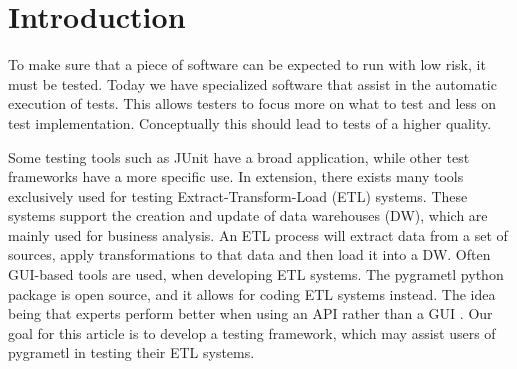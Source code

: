 \section{Introduction} %

To make sure that a piece of software can be expected to run with low risk, it must be tested. Today we have specialized software that assist in the automatic execution of tests. This allows testers to focus more on what to test and less on test implementation. Conceptually this should lead to tests of a higher quality.

Some testing tools such as JUnit have a  broad application, while other test frameworks have a more specific use. In extension, there exists many tools exclusively used for testing  Extract-Transform-Load (ETL) systems. These systems support the creation and update of data warehouses (DW), which are mainly used for business analysis. An ETL process will extract data from a set of sources, apply transformations to that data and then load it into a DW. Often GUI-based tools are used, when developing ETL systems. The pygrametl python package is open source, and it allows for coding ETL systems instead. The idea being that experts perform better when using an API rather than a GUI \cite{thomsen2009pygrametl}. Our goal for this article is to develop a testing framework, which may assist users of pygrametl in testing their ETL systems. 

